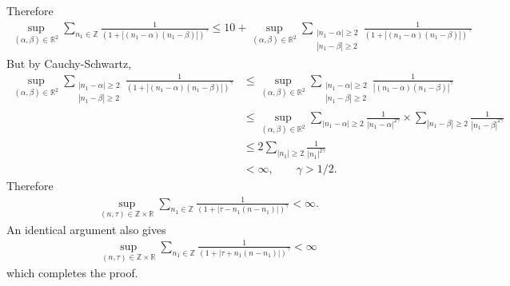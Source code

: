 \documentclass[12pt,reqno]{amsart}
\numberwithin{equation}{section}  %
\newcommand{\rr}{\mathbb{R}}
\newcommand{\zz}{\mathbb{Z}}
\begin{document}
\begin{appendices}
\begin{framed}
\end{framed}
%
Therefore
%
%
%
%
\begin{equation*}
\begin{split}
\sup_{(\alpha, \beta )\in \mathbb{R}^{2}}\sum_{n_1\in \zz}\frac{1}{(1 +
|(n_{1} - \alpha)(n_{1} - \beta)|)^{\gamma}} \le 10 +
\sup_{(\alpha, \beta )\in \mathbb{R}^{2}}\sum_{\substack{|n_1 - \alpha| \ge 2 \\
| n_{1} - \beta  | \ge 2}}\frac{1}{(1 +
|(n_{1} - \alpha)(n_{1} - \beta)|)^{\gamma}} 
\end{split}
\end{equation*}
But by Cauchy-Schwartz,
%
%
\begin{equation*}
\begin{split}
\sup_{(\alpha, \beta )\in \mathbb{R}^{2}}\sum_{\substack{|n_1 - \alpha| \ge 2 \\
| n_{1} - \beta  | \ge 2}}\frac{1}{(1 +
|(n_{1} - \alpha)(n_{1} - \beta)|)^{\gamma}}
& \le 
\sup_{(\alpha, \beta )\in \mathbb{R}^{2}}\sum_{\substack{|n_1 - \alpha| \ge 2 \\
| n_{1} - \beta  | \ge 2}}\frac{1}{|(n_{1} - \alpha)(n_{1} - \beta)|^{\gamma}} 
\\
& \le \sup_{(\alpha, \beta )\in \mathbb{R}^{2}}\sum_{|n_1 - \alpha|
\ge 2}\frac{1}{|n_{1} - \alpha|^{2\gamma}} \times \sum_{|n_1 - \beta|
\ge 2}\frac{1}{|n_{1} - \beta|^{2\gamma}} 
\\
& \le 2 \sum_{|n_1 |
\ge 2}\frac{1}{|n_{1} |^{2\gamma}}
\\
& < \infty, \qquad \gamma > 1/2.
\end{split}
\end{equation*}
%
Therefore
%
\begin{equation*}
\begin{split}
\sup_{(n,\tau)\in \zz \times \rr}\sum_{n_1\in \zz}\frac{1}{(1+|\tau-
n_1(n-n_1)|)^{\gamma}} < \infty.
\end{split}
\end{equation*}
An identical argument also gives
\begin{equation*}
\begin{split}
\sup_{(n,\tau)\in \zz \times \rr}\sum_{n_1\in \zz}\frac{1}{(1+|\tau+
n_1(n-n_1)|)^{\gamma}} < \infty
\end{split}
\end{equation*}
which completes the proof.  \qquad \qedsymbol
%

\end{appendices}
\end{document}
